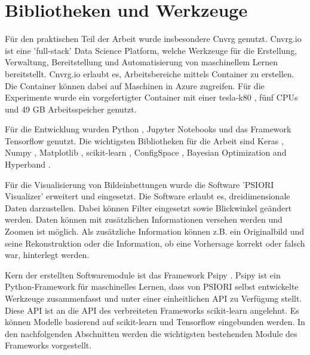 	\section{Bibliotheken und Werkzeuge}
	\label{sec:BibliothekenundWerkzeuge}
	Für den praktischen Teil der Arbeit wurde insbesondere Cnvrg \cite{Kolben.2020} genutzt. Cnvrg.io ist eine 'full-stack' Data Science Platform, welche Werkzeuge für die Erstellung, Verwaltung, Bereitstellung und Automatisierung von maschinellem Lernen bereitstellt. Cnvrg.io erlaubt es, Arbeitsbereiche mittels Container zu erstellen. Die Container können dabei auf Maschinen in Azure \cite{MicrosoftCorporation.2020} zugreifen. Für die Experimente wurde ein vorgefertigter Container mit einer tesla-k80 \cite{Nvidia.2020}, fünf CPUs und 49 GB Arbeitsspeicher genutzt. 

	Für die Entwicklung wurden Python \cite{PythonSoftwareFoundation.2020}, Jupyter Notebooks \cite{ProjectJupyter.} und das Framework Tensorflow \cite{MartinAbadi.2015}  genutzt. Die wichtigsten Bibliotheken für die Arbeit sind Keras \cite{Chollet.2015} , Numpy \cite{Oliphant.2006} , Matplotlib \cite{Hunter.2007} , scikit-learn \cite{Pedregosa.2011} , ConfigSpace \cite{Lindauer.2019} , Bayesian Optimization and Hyperband \cite{StefanFalkner.2018}. 
	
	Für die Visualisierung von Bildeinbettungen wurde die Software 'PSIORI Visualizer' erweitert und eingesetzt. Die Software erlaubt es, dreidimensionale Daten darzustellen. Dabei können Filter eingesetzt sowie Blickwinkel geändert werden. Daten können mit zusätzlichen Informationen versehen werden und Zoomen ist möglich. Als zusätzliche Information können z.B. ein Originalbild und seine Rekonstruktion oder die Information, ob eine Vorhersage korrekt oder falsch war, hinterlegt werden.
	
	Kern der erstellten Softwaremodule ist das Framework Psipy \cite{PSIORIGmbH.2019}. Psipy ist ein Python-Framework für maschinelles Lernen, dass von PSIORI selbst entwickelte Werkzeuge zusammenfasst und unter einer einheitlichen API zu Verfügung stellt. Diese API ist an die API des verbreiteten Frameworks scikit-learn angelehnt. Es können Modelle basierend auf scikit-learn  und Tensorflow eingebunden werden. In den nachfolgenden Abschnitten werden die wichtigsten bestehenden Module des Frameworks vorgestellt.
	
